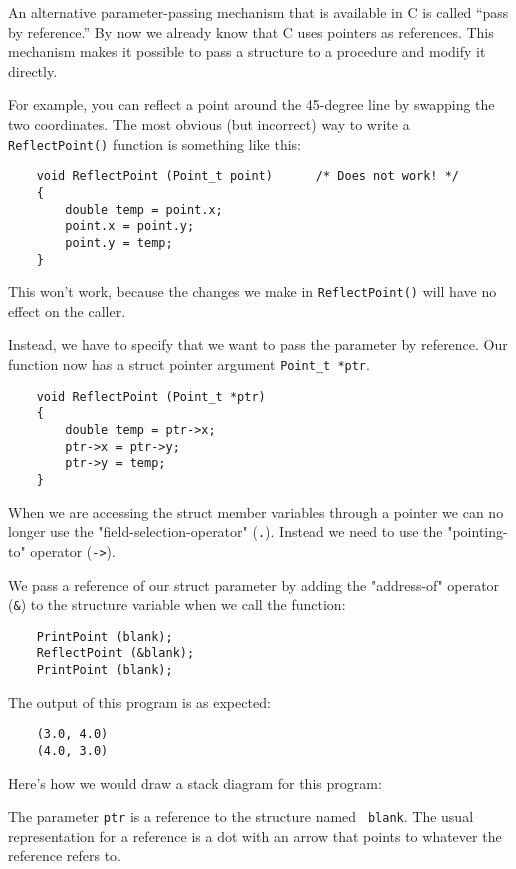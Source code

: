 An alternative parameter-passing mechanism that is available
in C is called ``pass by reference.''  
By now we already know that C uses pointers as references.
This mechanism makes
it possible to pass a structure to a procedure and modify it directly.

For example, you can reflect a point around the 45-degree line by
swapping the two coordinates.  The most obvious (but incorrect) way to
write a {\tt ReflectPoint()} function is something like this:

\begin{verbatim}
	void ReflectPoint (Point_t point)      /* Does not work! */
	{
		double temp = point.x;
		point.x = point.y;
		point.y = temp;
	}
\end{verbatim}
%
This won't work, because the changes we make in {\tt ReflectPoint()}
will have no effect on the caller.

Instead, we have to specify that we want to pass the parameter by
reference.  
Our function now has a struct pointer argument {\tt Point\_t~*ptr}.


\begin{verbatim}
	void ReflectPoint (Point_t *ptr)
	{
		double temp = ptr->x;
		ptr->x = ptr->y;
		ptr->y = temp;
	}
\end{verbatim}
When we are accessing the struct member variables through a pointer 
we can no longer use the "field-selection-operator" ({\tt .}). Instead we need to use
the "pointing-to" operator ({\tt ->}).

%
We pass a reference of our struct parameter by adding the "address-of"  operator ({\tt \&}) to the
structure variable when we call the function:

\begin{verbatim}
	PrintPoint (blank);
	ReflectPoint (&blank);
	PrintPoint (blank);
\end{verbatim}
%
The output of this program is as expected:

\begin{verbatim}
	(3.0, 4.0)
	(4.0, 3.0)
\end{verbatim}
%
Here's how we would draw a stack diagram for this program:

\vspace{0.1in}
\centerline{}
\vspace{0.1in}
%
The parameter {\tt ptr} is a reference to the structure named {\tt
	blank}.  The usual representation for a reference is a dot with an
arrow that points to whatever the reference refers to.


